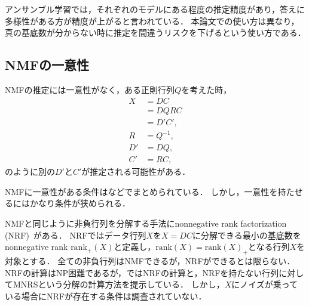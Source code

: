 アンサンブル学習では，それぞれのモデルにある程度の推定精度があり\cite{Kittler1998}，答えに多様性がある方が精度が上がる\cite{Kuncheva2006}と言われている．
本論文での使い方は異なり，真の基底数が分からない時に推定を間違うリスクを下げるという使い方である．

\subsection{NMFの一意性}
NMFの推定には一意性がなく，ある正則行列$Q$を考えた時，
\begin{align}
	X &= DC \\
	&= D Q R C \label{eq:dqrc} \\
	&= D'C', \\
	R &= Q^{-1}, \\
	D' &= DQ, \\
	C' &= RC,
\end{align}
のように別の$D'$と$C'$が推定される可能性がある．

NMFに一意性がある条件は\cite{Fu}などでまとめられている．
しかし，一意性を持たせるにはかなり条件が狭められる．

NMFと同じように非負行列を分解する手法にnonnegative rank factorization (NRF)~\cite{Dong2014}がある．
NRFではデータ行列$X$を$X = DC$に分解できる最小の基底数をnonnegative rank $\text{rank}_+(X)$と定義し，$\text{rank}(X) = \text{rank}(X)_+$となる行列$X$を対象とする．
全ての非負行列はNMFできるが，NRFができるとは限らない．
NRFの計算はNP困難であるが，\cite{Dong2014}ではNRFの計算と，NRFを持たない行列に対してMNRSという分解の計算方法を提示している．
しかし，$X$にノイズが乗っている場合にNRFが存在する条件は調査されていない．

